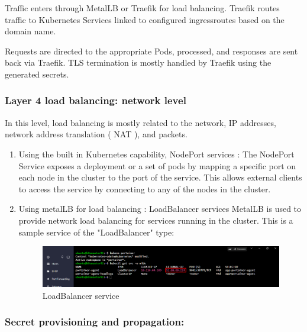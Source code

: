 \hspace{7mm}Traffic enters through MetalLB or Traefik for load balancing. Traefik routes traffic to Kubernetes Services linked to configured ingressroutes based on the domain name.

\hspace{7mm}Requests are directed to the appropriate Pods, processed, and responses are sent back via Traefik. TLS termination is mostly handled by Traefik using the generated secrets.

\subsubsection{Layer 4 load balancing: network level }

\hspace{7mm}In this level, load balancing is mostly related to the network, IP addresses, network address translation ( NAT ), and packets. 

\begin{enumerate}[label = (\alph*)]

\item Using the built in Kubernetes capability, NodePort services : The NodePort Service exposes a deployment or a set of pods by mapping a specific port on each node in the cluster to the port of the service. 
This allows external clients to access the service by connecting to any of the nodes in the cluster.

\item Using metalLB for load balancing : LoadBalancer services 
MetalLB is used to provide network load balancing for services running in the cluster. This is a sample service of the "LoadBalancer" type: 

\begin{figure}[H]\centering
\includegraphics[width=1.0\textwidth,angle=00]{assets/f23.png}
\caption{LoadBalancer service }
\label{fig:LoadBalancer}
\end{figure}

\end{enumerate}


\subsubsection{Secret provisioning and propagation:}

